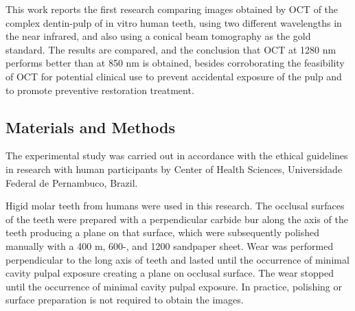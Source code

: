\documentclass[12pt,twoside,english]{book}
\renewcommand{\~}{\perispomeni}%
\numberwithin{equation}{section}
\numberwithin{figure}{section}
\begin{document}

This work reports the first research comparing images obtained by OCT of the complex dentin-pulp of in vitro human teeth, using two different wavelengths in the near infrared, and also using a conical beam tomography as the gold standard. The results are compared, and the conclusion that OCT at 1280 nm performs better than at 850 nm is obtained, besides corroborating the feasibility of OCT for potential clinical use to prevent accidental exposure of the pulp and to promote preventive restoration treatment.


\subsection{Materials and Methods}

The experimental study was carried out in accordance with the ethical guidelines in research with human participants by Center of Health Sciences, Universidade Federal de Pernambuco, Brazil. 

Higid molar teeth from humans were used in this research. The occlusal surfaces of the teeth were prepared with a perpendicular carbide bur along the axis of the teeth producing a plane on that surface, which were subsequently polished manually with a 400 m, 600-, and 1200 sandpaper sheet. Wear was performed perpendicular to the long axis of teeth and lasted until the occurrence of minimal cavity pulpal exposure creating a plane on occlusal surface. The wear stopped until the occurrence of minimal cavity pulpal exposure. In practice, polishing or surface preparation is not required to obtain the images. 
\end{document}
